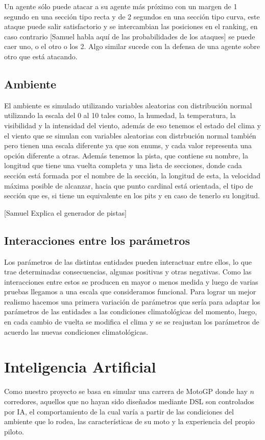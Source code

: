 \documentclass[12pt, letterpaper,spanish]{article}
\theoremstyle{definition}
\theoremstyle{remark}
\begin{document}
		Un agente sólo puede atacar a su agente más próximo con un margen de 1 segundo en una sección tipo recta y de 2 segundos en una sección tipo curva, este ataque puede salir satisfactorio y se intercambian las posiciones en el ranking, en caso contrario [Samuel habla aquí de las probabilidades de los ataques] se puede caer uno, o el otro o los 2. Algo similar sucede con la defensa de una agente sobre otro que está atacando.
	
	\subsection{Ambiente}
		El ambiente es simulado utilizando variables aleatorias con distribución normal utilizando la escala del 0 al 10 tales como, la humedad, la temperatura, la visibilidad y la intensidad del viento, además de eso tenemos el estado del clima y el viento que se simulan con variables aleatorias con distrbución normal también pero tienen una escala diferente ya que son enums, y cada valor representa una  opción diferente a otras. Además tenemos la pista, que contiene su nombre, la longitud que tiene una vuelta completa y una lista de secciones, donde cada sección está formada por el nombre de la sección, la longitud de esta, la velocidad máxima posible de alcanzar, hacia que punto cardinal está orientada, el tipo de sección que es, si tiene un equivalente en los pits y en caso de tenerlo su longitud. 
		
		[Samuel Explica el generador de pistas]
	
	\subsection{Interacciones entre los parámetros}
		Los parámetros de las distintas entidades pueden interactuar entre ellos, lo que trae determinadas consecuencias, algunas positivas y otras negativas. Como las interacciones entre estos se producen en mayor o menos medida y luego de varias pruebas llegamos a una escala que consideramos funcional. Para lograr un mejor realismo hacemos una primera variación de parámetros que sería para adaptar los parámetros de las entidades a las condiciones climatológicas del momento, luego, en cada cambio de vuelta se modifica el clima y se se reajustan los parámetros de acuerdo las nuevas condiciones climatológicas.

\section{Inteligencia Artificial}\cite{conferenciasIA}\cite{russell}
	Como nuestro proyecto se basa en simular una carrera de MotoGP donde hay $n$ corredores, aquellos que no hayan sido diseñados mediante DSL son controlados por IA, el comportamiento de la cual varía a partir de las condiciones del ambiente que lo rodea, las características de su moto y la experiencia del propio piloto.
	
\end{document}
